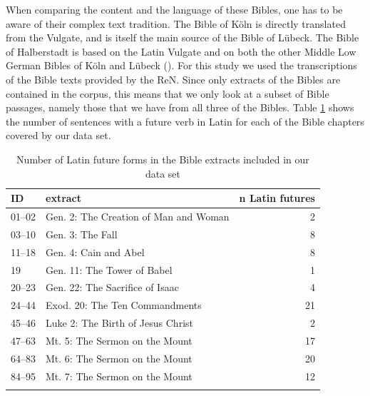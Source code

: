 \documentclass[output=paper,colorlinks,citecolor=brown]{langscibook}
\begin{document}
When comparing the content and the language of these Bibles, one has to be aware of their complex text tradition. The Bible of Köln is directly translated from the Vulgate, and is itself the main source of the Bible of Lübeck. The Bible of Halberstadt is based on the Latin Vulgate and on both the other Middle Low German Bibles of Köln and Lübeck (\cite[66, 120, 144]{EichenbergerWendland1977}). For this study we used the transcriptions of the Bible texts provided by the ReN. Since only extracts of the Bibles are contained in the corpus, this means that we only look at a subset of Bible passages, namely those that we have from all three of the Bibles. Table \ref{tab:ihden_schnee:extracts} shows the number of sentences with a future verb in Latin for each of the Bible chapters covered by our data set.

\begin{table}
\caption{Number of Latin future forms in the Bible extracts included in our data set}
\label{tab:ihden_schnee:extracts}
 \begin{tabularx}{\textwidth}{llr}
  \lsptoprule
  ID &extract & n Latin futures \\
  \midrule
   01--02 & Gen. 2: The Creation of Man and Woman & 2 \\
   03--10 & Gen. 3: The Fall & 8 \\
   11--18 & Gen. 4: Cain and Abel & 8 \\
   19& Gen. 11: The Tower of Babel & 1 \\
   20--23& Gen. 22: The Sacrifice of Isaac & 4 \\
   24--44& Exod. 20: The Ten Commandments & 21 \\
   45--46& Luke 2: The Birth of Jesus Christ & 2 \\
   47--63& Mt. 5: The Sermon on the Mount & 17\\
   64--83& Mt. 6: The Sermon on the Mount & 20 \\
   84--95& Mt. 7: The Sermon on the Mount & 12\\
    
  \lspbottomrule
 \end{tabularx}
\end{table}
\end{document}
